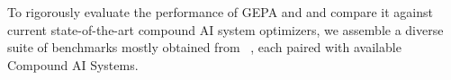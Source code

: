 \documentclass{article} %
\begin{document}

To rigorously evaluate the performance of GEPA and and compare it against current state-of-the-art compound AI system optimizers, we assemble a diverse suite of benchmarks mostly obtained from ~\citet{langprobe}, each paired with available Compound AI Systems. %
\end{document}

